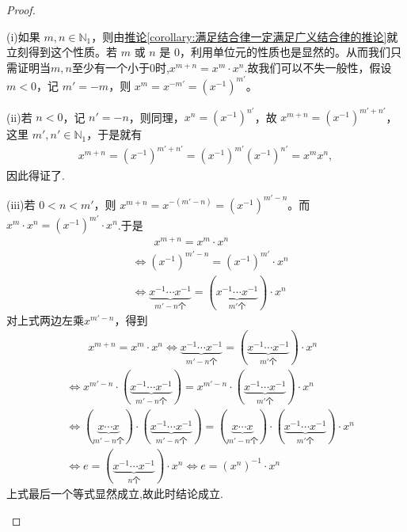 \documentclass[../../main.tex]{subfiles}
\begin{document}
\begin{proof}
\begin{enumerate}[(1)]
(i)如果 $m,n\in\mathbb{N}_1$，则由\hyperref[corollary:满足结合律一定满足广义结合律的推论]{推论\ref{corollary:满足结合律一定满足广义结合律的推论}}就立刻得到这个性质。若 $m$ 或 $n$ 是 $0$，利用单位元的性质也是显然的。从而我们只需证明当$m,n$至少有一个小于0时,$x^{m+n}=x^m\cdot x^n$.故我们可以不失一般性，假设 $m<0$，记 $m'=-m$，则 $x^m = x^{-m'}=(x^{-1})^{m'}$。

(ii)若 $n<0$，记 $n'=-n$，则同理，$x^n=(x^{-1})^{n'}$，故 $x^{m + n}=(x^{-1})^{m'+n'}$，这里 $m',n'\in\mathbb{N}_1$，于是就有
\begin{align*}
x^{m+n}=(x^{-1})^{m' +n'}=\left( x^{-1} \right) ^{m'}\left( x^{-1} \right) ^{n'}=x^mx^n,
\end{align*}
因此得证了.

(iii)若 $0 < n < m'$，则 $x^{m + n}=x^{-(m'-n)}=(x^{-1})^{m'-n}$。而 $x^m\cdot x^n=(x^{-1})^{m'}\cdot x^n$.于是
\begin{align*}
&\quad \quad x^{m + n}=x^m\cdot x^n\\
&\Leftrightarrow (x^{-1})^{m' - n}=(x^{-1})^{m'}\cdot x^n\\
&\Leftrightarrow \underbrace{x^{-1}\cdots x^{-1}}_{m' - n\text{个}}= \left(\underbrace{x^{-1}\cdots x^{-1}}_{m'\text{个}}\right)\cdot x^n
\end{align*}
对上式两边左乘$x^{m' - n}$，得到
\begin{align*}
&\quad \quad x^{m + n}=x^m\cdot x^n
\Leftrightarrow \underbrace{x^{-1}\cdots x^{-1}}_{m' - n\text{个}}= \left(\underbrace{x^{-1}\cdots x^{-1}}_{m'\text{个}}\right)\cdot x^n
\\
&\Leftrightarrow x^{m' -n}\cdot \left( \underset{m' -n\text{个}}{\underbrace{x^{-1}\cdots x^{-1}}} \right) =x^{m' -n}\cdot \left( \underset{m' \text{个}}{\underbrace{x^{-1}\cdots x^{-1}}} \right) \cdot x^n
\\
&\Leftrightarrow \left( \underset{m' -n\text{个}}{\underbrace{x\cdots x}} \right) \cdot \left( \underset{m' -n\text{个}}{\underbrace{x^{-1}\cdots x^{-1}}} \right) =\left( \underset{m' -n\text{个}}{\underbrace{x\cdots x}} \right) \cdot \left( \underset{m' \text{个}}{\underbrace{x^{-1}\cdots x^{-1}}} \right) \cdot x^n
\\
&\Leftrightarrow e=\left( \underset{n\text{个}}{\underbrace{x^{-1}\cdots x^{-1}}} \right) \cdot x^n
\Leftrightarrow e=(x^n)^{-1}\cdot x^n
\end{align*}
上式最后一个等式显然成立,故此时结论成立.


\end{enumerate}
\end{proof}
\end{document}
